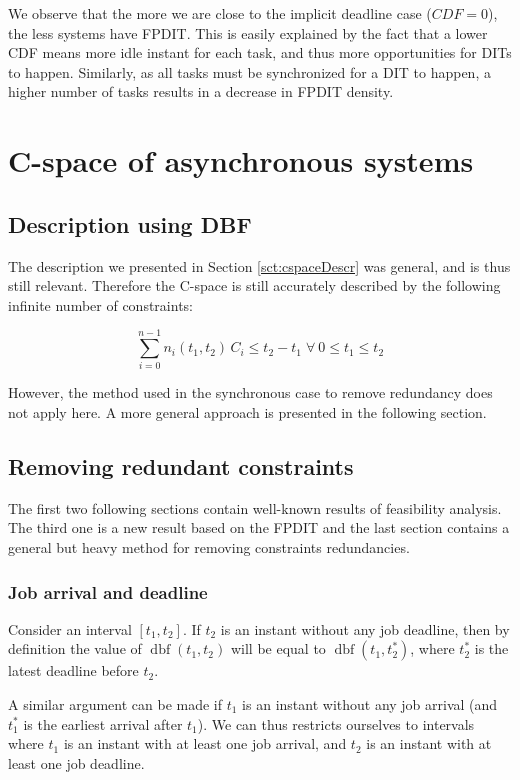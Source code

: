 \documentclass[conference]{IEEEtran}
\newcommand{\dbf}[1]{\operatorname{dbf}(#1)}
\begin{document}
	We observe that the more we are close to the implicit deadline case ($CDF = 0$), the less systems have FPDIT. This is easily explained by the fact that a lower CDF means more idle instant for each task, and thus more opportunities for DITs to happen. Similarly, as all tasks must be synchronized for a DIT to happen, a higher number of tasks results in a decrease in FPDIT density.

\section{C-space of asynchronous systems}
\label{sct:asyncCspace}

	\subsection{Description using DBF}

		The description we presented in Section \ref{sct:cspaceDescr} was general, and
		is thus still relevant. Therefore the C-space is still accurately described by
		the following infinite number of constraints:

		\[
			\sum_{i=0}^{n-1} n_i(t_1, t_2)
			\, C_i \leq t_2 - t_1 \; \forall \: 0 \leq t_1 \leq t_2
		\]

		However, the method used in the synchronous case to remove redundancy does not
		apply here. A more general approach is presented in the following section.

	\subsection{Removing redundant constraints}

		The first two following sections contain well-known results of feasibility analysis.
		The third one is a new result based on the FPDIT and the last section contains a general
		but heavy method for removing constraints redundancies.

		\subsubsection{Job arrival and deadline}
			Consider an interval $[t_1, t_2]$. If $t_2$ is an instant without any job
			deadline, then by definition the value of $\dbf{t_1, t_2}$ will be equal to
			$\dbf{t_1, t_2^*}$, where $t_2^*$ is the latest deadline before $t_2$.

			A similar argument can be made if $t_1$ is an instant without any job arrival
			(and $t_1^*$ is the earliest arrival after $t_1$). We can thus restricts
			ourselves to intervals where $t_1$ is an instant with at least one job
			arrival, and $t_2$ is an instant with at least one job deadline.
\end{document}
